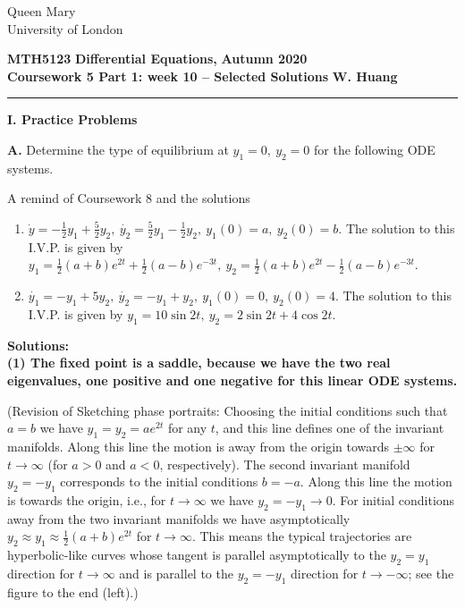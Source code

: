 \documentclass[11pt,a4paper]{article}
\begin{document}
	\begin{singlespace}
		\begin{center}
			\Huge Queen Mary\\
			\LARGE University of London
		\end{center}
		\Large \textbf{MTH5123} \hfill \Large \textbf{Differential Equations,} \hfill \Large \textbf{Autumn 2020}\\
		\large \textbf{Coursework 5 Part 1: week 10 – Selected Solutions} \hfill \large \textbf{W. Huang}
		\rule{\textwidth}{0.4pt}
	\end{singlespace}
	\textbf{I. Practice Problems}\par
	\textbf{A.} Determine the type of equilibrium at $y_1 = 0,\ y_2 = 0$ for the following ODE systems.\par
	A remind of Coursework 8 and the solutions
	\begin{enumerate}[1)]
		\item $\dot{y} = -\frac{1}{2}y_1 + \frac{5}{2}y_2,\ \dot{y_2} = \frac{5}{2}y_1-\frac{1}{2}y_2,\ y_1(0) = a,\ y_2(0) = b$. The solution to this I.V.P. is given by $y_1=\frac{1}{2}(a+b)e^{2t}+\frac{1}{2}(a-b)e^{-3t},\ y_2 = \frac{1}{2}(a+b)e^{2t}-\frac{1}{2}(a-b)e^{-3t}$.
		\item $\dot{y_1} = -y_1+5y_2,\ \dot{y_2} = -y_1+y_2,\ y_1(0) = 0,\ y_2(0) = 4$. The solution to this I.V.P. is given by $y_1 = 10 \sin 2t,\ y_2 = 2 \sin 2t + 4 \cos 2t$.
	\end{enumerate}
	\textbf{Solutions:}\\
	\textbf{(1) The fixed point is a saddle, because we have the two real eigenvalues, one positive and one negative for this linear ODE systems.}\par
	(Revision of Sketching phase portraits: Choosing the initial conditions such that $a = b$ we have $y_1 = y_2 = ae^{2t}$ for any $t$, and this line defines one of the invariant manifolds. Along this line the motion is away from the origin towards $\pm \infty$ for $t \to \infty$ (for $a > 0$ and $a < 0$, respectively). The second invariant manifold $y_2 = -y_1$ corresponds to the initial conditions $b = -a$. Along this line the motion is towards the origin, i.e., for $t \to \infty$ we have $y_2 = -y_1 \to 0$. For initial conditions away from the two invariant manifolds we have asymptotically $y_2\approx y_1\approx \frac{1}{2}(a+b)e^{2t}$ for $t\to \infty$. This means the typical trajectories are hyperbolic-like curves whose tangent is parallel asymptotically to the $y_2 = y_1$ direction for $t \to \infty$ and is parallel to the $y_2 = -y_1$ direction for $t \to -\infty$; see the figure to the end (left).)\par
\end{document}
